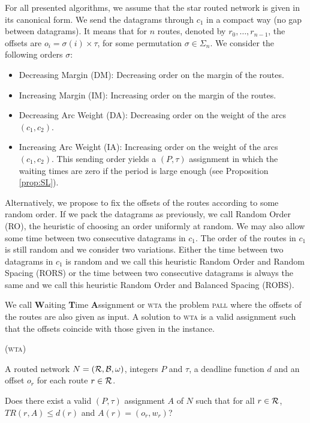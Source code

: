 \documentclass[a4paper,10pt]{journal}
\newcommand\pall{\textsc{pall}\xspace}
\newcommand\wta{\textsc{wta}\xspace}
\begin{document}
For all presented algorithms, we assume that the star routed network is given in its canonical form.
We send the datagrams through $c_1$ in a compact way (no gap between datagrams). It means that for $n$ routes, denoted by $r_0, \dots, r_{n-1}$, the offsets are $o_i = \sigma(i) \times \tau$, for some permutation $\sigma \in \Sigma_n$. We consider the following orders $\sigma$:

\begin{itemize}
\item Decreasing Margin (DM): Decreasing order on the margin of the routes.
\item Increasing Margin (IM): Increasing order on the margin of the routes.
\item Decreasing Arc Weight (DA): Decreasing order on the weight of the arcs $(c_1,c_2)$.
\item Increasing Arc Weight (IA): Increasing order on the weight of the arcs $(c_1,c_2)$. This sending order yields a $(P,\tau)$ assignment in which the waiting times are zero if the period is large enough (see Proposition \ref{prop:SL}).
\end{itemize}

Alternatively, we propose to fix the offsets of the routes according to some random order.
If we pack the datagrams as previously, we call Random Order (RO), the heuristic of choosing an order
uniformly at random. We may also allow some time between two consecutive datagrams in $c_1$. The order of the routes in $c_1$ is still random and we consider two variations. Either the time between two datagrams in $c_1$ is random and we call this heuristic Random Order and Random Spacing (RORS) or the time between two consecutive datagrams is always the same and we call this heuristic Random Order and Balanced Spacing (ROBS).

We call \textbf{W}aiting \textbf{T}ime \textbf{A}ssignment or \wta the problem \pall where the offsets of the routes are also given as input. A solution to \wta is a valid assignment such that the offsets coincide with those given in the instance.




 \bigskip

      (\wta)

        A routed network $N=({\cal R},{\cal B},\omega)$, integers $P$ and $\tau$, a deadline function $d$ and an offset $o_r$ for each route $r \in {\cal R}$.
      
       Does there exist a valid $(P,\tau)$ assignment $A$ of $N$ such that for all $r \in {\cal R}$, $TR(r,A) \leq d(r)$ and $A(r) = (o_r,w_r)$?
      \bigskip
\end{document}
